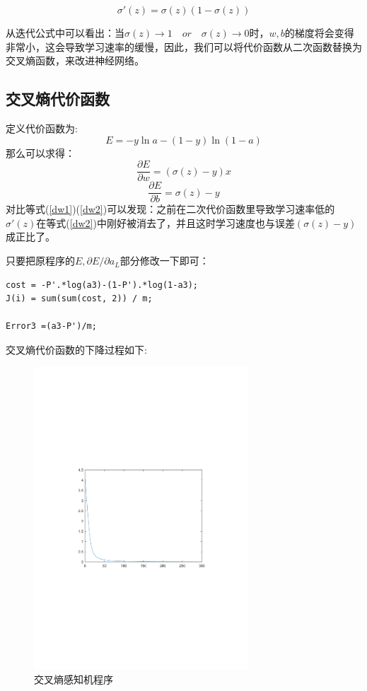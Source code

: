 \[\sigma'({z})=\sigma({z})(1-\sigma({z}))\]

从迭代公式中可以看出：当$\sigma({z})\rightarrow1\quad or\quad \sigma({z})\rightarrow0$时，$w,b$的梯度将会变得非常小，这会导致学习速率的缓慢，因此，我们可以将代价函数从二次函数替换为交叉熵函数，来改进神经网络。

\subsection{交叉熵代价函数}
定义代价函数为:
\[E = -y\ln a-(1-y)\ln (1-a) \]
那么可以求得：
\begin{equation}
\frac{{\partial E}}{{\partial {w}}} = (\sigma({z})-y)x \label{dw2}
\end{equation}
\begin{equation}
\frac{{\partial E}}{{\partial {b}}} = \sigma({z})-y \label{db2}
\end{equation}
对比等式(\ref{dw1})(\ref{dw2})可以发现：之前在二次代价函数里导致学习速率低的$\sigma'({z})$在等式(\ref{dw2})中刚好被消去了，并且这时学习速度也与误差$(\sigma({z})-y)$成正比了。

只要把原程序的$E,\partial E/\partial a_L$部分修改一下即可：
\begin{lstlisting}
cost = -P'.*log(a3)-(1-P').*log(1-a3);
J(i) = sum(sum(cost, 2)) / m; 	

Error3 =(a3-P')/m; 
\end{lstlisting}

交叉熵代价函数的下降过程如下:

\begin{figure}[H]
\centering
\includegraphics[width=8cm]{fig/test3.pdf}
\caption{交叉熵感知机程序}
\end{figure}

